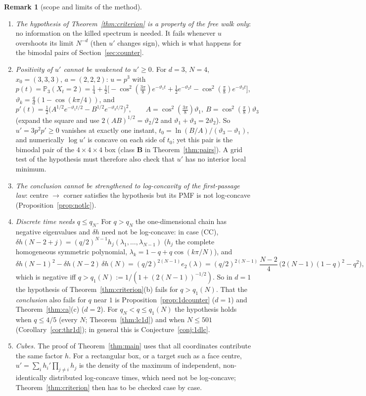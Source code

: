 \documentclass[11pt,a4paper]{article}
\theoremstyle{definition}
\newtheorem{remark}[theorem]{Remark}
\newcommand{\Prob}{\mathbb P}
\begin{document}
\begin{remark}[scope and limits of the method]\label{rem:scope}
\begin{enumerate}
\item \emph{The hypothesis of Theorem~\ref{thm:criterion} is a property of the free walk only}: no information on the killed spectrum is needed. It fails whenever $u$ overshoots its limit $N^{-d}$ (then $u'$ changes sign), which is what happens for the bimodal pairs of Section~\ref{sec:counter}.
\item \emph{Positivity of $u'$ cannot be weakened to $u'\ge0$.} For $d=3$, $N=4$, $x_0=(3,3,3)$, $a=(2,2,2)$: $u=p^3$ with $p(t)=\Prob_3(X_t=2)=\frac14+\frac12\bigl[-\cos^2(\tfrac{3\pi}8)e^{-\vartheta_1t}+\tfrac12e^{-\vartheta_2t}-\cos^2(\tfrac\pi8)e^{-\vartheta_3t}\bigr]$, $\vartheta_k=\frac qd(1-\cos(k\pi/4))$, and
\[
p'(t)=\tfrac12\bigl(A^{1/2}e^{-\vartheta_1t/2}-B^{1/2}e^{-\vartheta_3t/2}\bigr)^2,\qquad A=\cos^2(\tfrac{3\pi}8)\vartheta_1,\ B=\cos^2(\tfrac\pi8)\vartheta_3
\]
(expand the square and use $2(AB)^{1/2}=\vartheta_2/2$ and $\vartheta_1+\vartheta_3=2\vartheta_2$). So $u'=3p^2p'\ge0$ vanishes at exactly one instant, $t_0=\ln(B/A)/(\vartheta_3-\vartheta_1)$, and numerically $\log u'$ is concave on each side of $t_0$; yet this pair is the bimodal pair of the $4\times4\times4$ box (class \textbf{B} in Theorem~\ref{thm:pairs}). A grid test of the hypothesis must therefore also check that $u'$ has no interior local minimum.
\item \emph{The conclusion cannot be strengthened to log-concavity of the first-passage law}: centre $\to$ corner satisfies the hypothesis but its PMF is not log-concave (Proposition~\ref{prop:notlc}).
\item \emph{Discrete time needs $q\le q_N$.} For $q>q_N$ the one-dimensional chain has negative eigenvalues and $\delta h$ need not be log-concave: in case (CC), $\delta h(N-2+j)=(q/2)^{N-1}h_j(\lambda_1,\dots,\lambda_{N-1})$ ($h_j$ the complete homogeneous symmetric polynomial, $\lambda_k=1-q+q\cos(k\pi/N)$), and
\[
\delta h(N-1)^2-\delta h(N-2)\,\delta h(N)=(q/2)^{2(N-1)}e_2(\lambda)=(q/2)^{2(N-1)}\,\frac{N-2}4\,\bigl(2(N-1)(1-q)^2-q^2\bigr),
\]
which is negative iff $q>q_1(N):=1/(1+(2(N-1))^{-1/2})$. So in $d=1$ the hypothesis of Theorem~\ref{thm:criterion}(b) fails for $q>q_1(N)$. That the \emph{conclusion} also fails for $q$ near $1$ is Proposition~\ref{prop:1dcounter} ($d=1$) and Theorem~\ref{thm:ca}(c) ($d=2$). For $q_N<q\le q_1(N)$ the hypothesis holds when $q\le4/5$ (every $N$; Theorem~\ref{thm:lc1d}) and when $N\le501$ (Corollary~\ref{cor:thr1d}); in general this is Conjecture~\ref{conj:1dlc}.
\item \emph{Cubes.} The proof of Theorem~\ref{thm:main} uses that all coordinates contribute the same factor $h$. For a rectangular box, or a target such as a face centre, $u'=\sum_ih_i'\prod_{j\ne i}h_j$ is the density of the maximum of independent, non-identically distributed log-concave times, which need not be log-concave; Theorem~\ref{thm:criterion} then has to be checked case by case.
\end{enumerate}
\end{remark}
\end{document}
